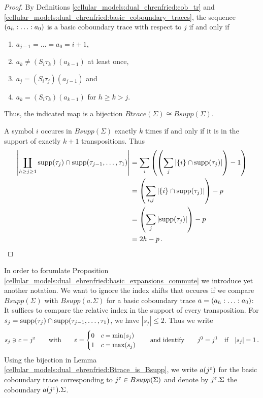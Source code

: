 \begin{proof}
    By Definitions \ref{cellular_models:dual_ehrenfried:cob_tr} and \ref{cellular_models:dual_ehrenfried:basic_coboundary_traces},
    the sequence $\homog[a]$ is a basic coboundary trace with respect to $j$ if and only if
    \begin{enumerate}
        \item $a_{j-1} = \ldots = a_0 = i+1$,
        \item $a_k \neq (S_i\tau_k)(a_{k-1})$ at least once,
        \item $a_j = (S_i\tau_j)(a_{j-1})$ and
        \item $a_k = (S_i\tau_k)(a_{k-1})$ for $h \ge k > j$.
    \end{enumerate}
    Thus, the indicated map is a bijection $Btrace(\Sigma) \cong Bsupp(\Sigma)$.

    A symbol $i$ occures in $Bsupp(\Sigma)$ exactly $k$ times if and only if it is in the support of exactly $k+1$ transpositions.
    Thus
    \begin{align*}
        \left| \coprod_{h \ge j \ge 1} \supp(\tau_j) \cap \supp(\tau_{j-1}, \ldots, \tau_1) \right| 
            &= \sum_i \left( \left( \sum_j \left| \{i \} \cap \supp(\tau_j) \right| \right) - 1 \right)\\
            &= \left( \sum_{i,j} \left| \{i \} \cap \supp(\tau_j) \right| \right) - p \\
            &= \left( \sum_j \left| \supp(\tau_j) \right| \right) - p \\
            &= 2h-p \,.
    \end{align*}
\end{proof}

\begin{notation}
    \label{cellular_models:dual_ehrenfried:j_notation}%
    In order to forumlate Proposition \ref{cellular_models:dual_ehrenfried:basic_expansions_commute} we introduce yet another notation.
    We want to ignore the index shifts that occures if we compare $Bsupp(\Sigma)$ with $Bsupp(a.\Sigma)$ for a basic coboundary trace $a = \homog[a]$:
    It suffices to compare the relative index in the support of every transposition.
    For $s_j = \supp(\tau_j) \cap \supp(\tau_{j-1}, \ldots, \tau_1)$, we have $|s_j| \le 2$.
    Thus we write
    \[
        s_j \ni c = j^\eps \mspc{with}{20} \eps = \begin{cases} 0 & c = \min(s_j) \\ 1 & c = \max(s_j) \end{cases} \mspc{and identify}{20} j^0 = j^1 \mspc{if}{10} |s_j| = 1 \,.
    \]
    Using the bijection in Lemma \ref{cellular_models:dual_ehrenfried:Btrace_is_Bsupp}, we write $a(j^\eps)$ for the basic coboundary trace corresponding to $j^\eps \in Bsupp(\Sigma)$ and
    denote by $j^\eps.\Sigma$ the coboundary $a(j^\eps).\Sigma$.
\end{notation}

